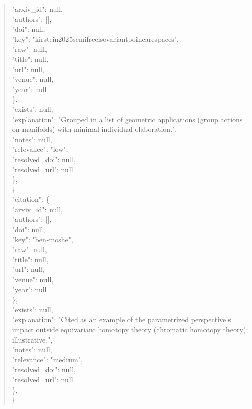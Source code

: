\documentclass[11pt]{article}
\begin{document}
\begin{quote}
        "arxiv\_id": null,\\
        "authors": [],\\
        "doi": null,\\
        "key": "kirstein2025semifreeisovariantpoincarespaces",\\
        "raw": null,\\
        "title": null,\\
        "url": null,\\
        "venue": null,\\
        "year": null\\
      \},\\
      "exists": null,\\
      "explanation": "Grouped in a list of geometric applications (group actions on manifolds) with minimal individual elaboration.",\\
      "notes": null,\\
      "relevance": "low",\\
      "resolved\_doi": null,\\
      "resolved\_url": null\\
    \},\\
    \{\\
      "citation": \{\\
        "arxiv\_id": null,\\
        "authors": [],\\
        "doi": null,\\
        "key": "ben-moshe",\\
        "raw": null,\\
        "title": null,\\
        "url": null,\\
        "venue": null,\\
        "year": null\\
      \},\\
      "exists": null,\\
      "explanation": "Cited as an example of the parametrized perspective's impact outside equivariant homotopy theory (chromatic homotopy theory); illustrative.",\\
      "notes": null,\\
      "relevance": "medium",\\
      "resolved\_doi": null,\\
      "resolved\_url": null\\
    \},\\
    \{\\

\end{quote}
\end{document}
